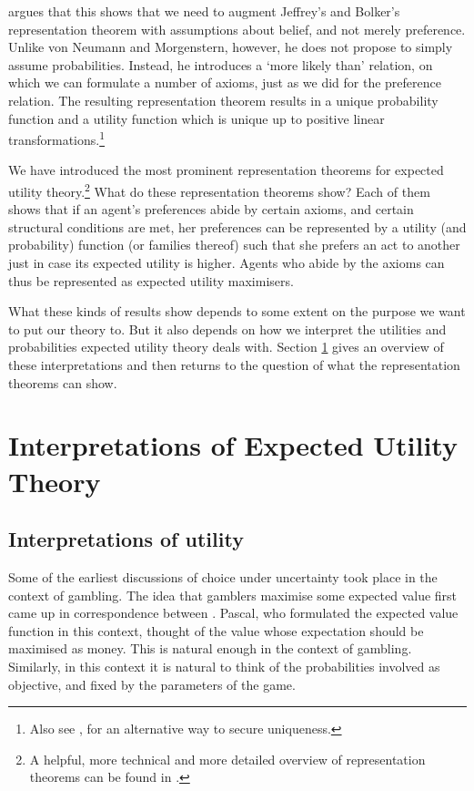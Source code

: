 \citet{Joyce1999} argues that this shows that we need to augment Jeffrey's and Bolker's representation theorem with assumptions about belief, and not merely preference. Unlike von Neumann and Morgenstern, however, he does not propose to simply assume probabilities. Instead, he introduces a `more likely than' relation, on which we can formulate a number of axioms, just as we did for the preference relation. The resulting representation theorem results in a unique probability function and a utility function which is unique up to positive linear transformations.\footnote{Also see \citet{Bradley1998}, for an alternative way to secure uniqueness.}

We have introduced the most prominent representation theorems for expected utility theory.\footnote{A helpful, more technical and more detailed overview of representation theorems can be found in \citet{Fishburn1981}.} What do these representation theorems show? Each of them shows that if an agent's preferences abide by certain axioms, and certain structural conditions are met, her preferences can be represented by a utility (and probability) function (or families thereof) such that she prefers an act to another just in case its expected utility is higher. Agents who abide by the axioms can thus be represented as expected utility maximisers.

What these kinds of results show depends to some extent on the purpose we want to put our theory to. But it also depends on how we interpret the utilities and probabilities expected utility theory deals with. Section \ref{s3} gives an overview of these interpretations and then returns to the question of what the representation theorems can show.

\section{Interpretations of Expected Utility Theory} \label{s3}

\subsection{Interpretations of utility}\label{subs31}

Some of the earliest discussions of choice under uncertainty took place in the context of gambling. The idea that gamblers maximise some expected value first came up in correspondence between \citet{FermatPascal1654}. Pascal, who formulated the expected value function in this context, thought of the value whose expectation should be maximised as money. This is natural enough in the context of gambling. Similarly, in this context it is natural to think of the probabilities involved as objective, and fixed by the parameters of the game.

